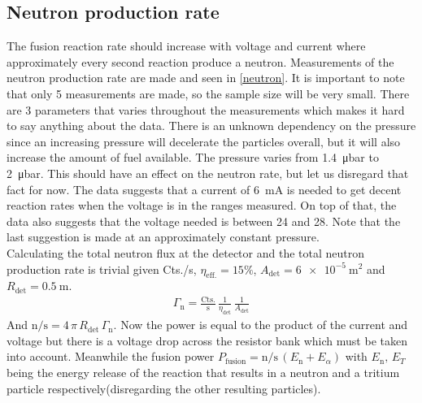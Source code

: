 \subsection{Neutron production rate}
The fusion reaction rate should increase with voltage and current where approximately every second reaction produce a neutron. Measurements of the neutron production rate are made and seen in \cref{neutron}. It is important to note that only 5 measurements are made, so the sample size will be very small. There are 3 parameters that varies throughout the measurements which makes it hard to say anything about the data. There is an unknown dependency on the pressure since an increasing pressure will decelerate the particles overall, but it will also increase the amount of fuel available. The pressure varies from \SI{1.4}{\micro\bar} to \SI{2}{\micro\bar}. This should have an effect on the neutron rate, but let us disregard that fact for now. The data suggests that a current of \SI{6}{\milli\ampere} is needed to get decent reaction rates when the voltage is in the ranges measured. On top of that, the data also suggests that the voltage needed is between \SI{24}{\volts} and \SI{28}{\volts}. Note that the last suggestion is made at an approximately constant pressure.\\
Calculating the total neutron flux at the detector and the total neutron production rate is trivial given Cts./s,  \(\eta_{\mathrm{eff.}}=15\%\), \(A_{\mathrm{det}}=\SI{6e-5}{\meter\squared}\) and \(R_{\mathrm{det}}=\SI{0.5}{\meter}\).
\begin{align}
	\Gamma_{\mathrm{n}}=\frac{\mathrm{Cts.}}{\mathrm{s}}\,\frac{1}{\eta_{\mathrm{det}}}\,\frac{1}{A_{\mathrm{det}}}
\end{align}
And \(\mathrm{n}/\mathrm{s}=4\,\pi\, R_{\mathrm{det}}\,\Gamma_{\mathrm{n}}\). Now the power is equal to the product of the current and voltage but there is a voltage drop across the resistor bank which must be taken into account. Meanwhile the fusion power \(P_{\mathrm{fusion}}=\mathrm{n}/\mathrm{s}\, (E_{\mathrm{n}}+E_{\alpha})\) with \(E_{\mathrm{n}},\,E_{T}\) being the energy release of the reaction that results in a neutron and a tritium particle respectively(disregarding the other resulting particles).






